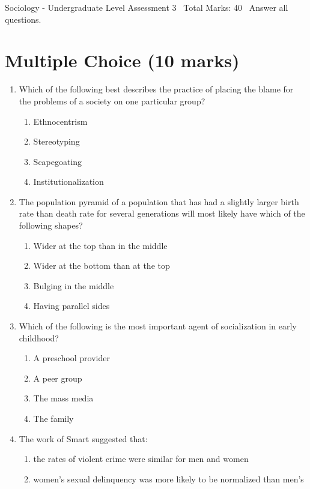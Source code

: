 \documentclass[12pt]{article}
\begin{document}
\begin{center}
Sociology - Undergraduate Level Assessment 3 \
Total Marks: 40 \
Answer all questions.
\end{center}

\section*{Multiple Choice (10 marks)}
\begin{enumerate}[label=\arabic*.]
\item Which of the following best describes the practice of placing the blame for the problems of a society on one particular group?
\begin{enumerate}[label=(\alph*)]
    \item Ethnocentrism
    \item Stereotyping
    \item Scapegoating
    \item Institutionalization
\end{enumerate}
\item The population pyramid of a population that has had a slightly larger birth rate than death rate for several generations will most likely have which of the following shapes?
\begin{enumerate}[label=(\alph*)]
    \item Wider at the top than in the middle
    \item Wider at the bottom than at the top
    \item Bulging in the middle
    \item Having parallel sides
\end{enumerate}
\item Which of the following is the most important agent of socialization in early childhood?
\begin{enumerate}[label=(\alph*)]
    \item A preschool provider
    \item A peer group
    \item The mass media
    \item The family
\end{enumerate}
\item The work of Smart suggested that:
\begin{enumerate}[label=(\alph*)]
    \item the rates of violent crime were similar for men and women
    \item women's sexual delinquency was more likely to be normalized than men's

\end{enumerate}
\end{enumerate}
\end{document}
